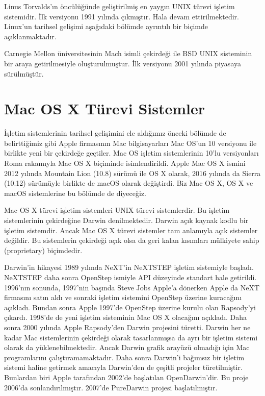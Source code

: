 \documentclass[a4paper,10pt,turkish]{sphinxmanual}
\begin{document}
\begin{description}
\sphinxAtStartPar
Linus Torvalds’ın öncülüğünde geliştirilmiş en yaygın UNIX türevi işletim sistemidir.
İlk versiyonu 1991 yılında çıkmıştır. Hala devam ettirilmektedir. Linux’un tarihsel
gelişimi aşağıdaki bölümde ayrıntılı bir biçimde açıklanmaktadır.

\sphinxAtStartPar
Carnegie Mellon üniversitesinin Mach isimli çekirdeği ile BSD UNIX sisteminin bir araya
getirilmesiyle oluşturulmuştur. İlk versiyonu 2001 yılında piyasaya sürülmüştür.

\end{description}


\section{Mac OS X Türevi Sistemler}
\label{\detokenize{introduction:mac-os-x-turevi-sistemler}}
\sphinxAtStartPar
İşletim sistemlerinin tarihsel gelişimini ele aldığımız önceki bölümde de belirttiğimiz gibi
Apple firmasının Mac bilgisayarları Mac OS’un 10 versiyonu ile birlikte yeni bir çekirdeğe
geçtiler. Mac OS işletim sistemlerinin 10’lu versiyonları Roma rakamıyla Mac OS X biçiminde
isimlendirildi. Apple Mac OS X ismini 2012 yılında Mountain Lion (10.8) sürümü ile OS X
olarak, 2016 yılında da Sierra (10.12) sürümüyle birlikte de macOS olarak değiştirdi. Biz
Mac OS X, OS X ve macOS sistemlerine bu bölümde  de diyeceğiz.

\sphinxAtStartPar
Mac OS X türevi işletim sistemleri UNIX türevi sistemlerdir. Bu işletim sistemlerinin
çekirdeğine Darwin denilmektedir. Darwin açık kaynak kodlu bir işletim sistemdir. Ancak
Mac OS X türevi sistemler tam anlamıyla açık sistemler değildir. Bu sistemlerin çekirdeği
açık olsa da geri kalan kısımları mülkiyete sahip (proprietary) biçimdedir.

\sphinxAtStartPar
Darwin’in hikayesi 1989 yılında NeXT’in NeXTSTEP işletim sistemiyle başladı. NeXTSTEP
daha sonra OpenStep ismiyle API düzeyinde standart hale getirildi. 1996’nın sonunda,
1997’nin başında Steve Jobs Apple’a dönerken Apple da NeXT firmasını satın aldı ve sonraki
işletim sistemini OpenStep üzerine kuracağını açıkladı. Bundan sonra Apple 1997’de OpenStep
üzerine kurulu olan Rapsody’yi çıkardı. 1998’de de yeni işletim sisteminin Mac OS X
olacağını açıkladı. Daha sonra 2000 yılında Apple Rapsody’den Darwin projesini türetti.
Darwin her ne kadar Mac sistemlerinin çekirdeği olarak tasarlanmışsa da ayrı bir işletim
sistemi olarak da yüklenebilmektedir. Ancak Darwin grafik arayüzü olmadığı için Mac
programlarını çalıştıramamaktadır. Daha sonra Darwin’i bağımsız bir işletim sistemi haline
getirmek amacıyla Darwin’den de çeşitli projeler türetilmiştir. Bunlardan biri Apple
tarafından 2002’de başlatılan OpenDarwin’dir. Bu proje 2006’da sonlandırılmıştır. 2007’de
PureDarwin projesi başlatılmıştır.
\end{document}
